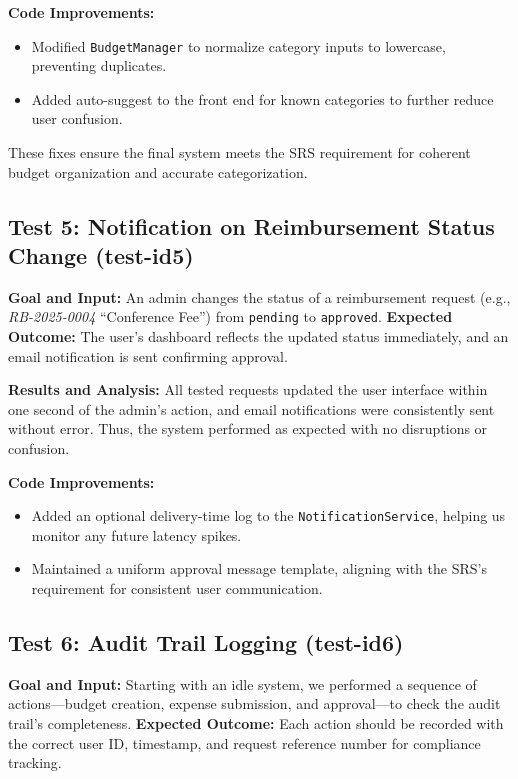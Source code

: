 \documentclass[12pt, titlepage]{article}
\begin{document}
\noindent
\textbf{Code Improvements:}
\begin{itemize}
  \item Modified \texttt{BudgetManager} to normalize category inputs to lowercase, preventing duplicates.
  \item Added auto-suggest to the front end for known categories to further reduce user confusion.
\end{itemize}
These fixes ensure the final system meets the SRS requirement for coherent budget organization and accurate categorization.


\subsection{Test 5: Notification on Reimbursement Status Change (test-id5)}

\noindent
\textbf{Goal and Input:}  
An admin changes the status of a reimbursement request (e.g., \emph{RB-2025-0004} “Conference Fee”) from \texttt{pending} to \texttt{approved}.  
\textbf{Expected Outcome:} The user’s dashboard reflects the updated status immediately, and an email notification is sent confirming approval.

\noindent
\textbf{Results and Analysis:}  
All tested requests updated the user interface within one second of the admin’s action, and email notifications were consistently sent without error. Thus, the system performed as expected with no disruptions or confusion.

\noindent
\textbf{Code Improvements:}
\begin{itemize}
  \item Added an optional delivery-time log to the \texttt{NotificationService}, helping us monitor any future latency spikes.
  \item Maintained a uniform approval message template, aligning with the SRS’s requirement for consistent user communication.
\end{itemize}


\subsection{Test 6: Audit Trail Logging (test-id6)}

\noindent
\textbf{Goal and Input:}  
Starting with an idle system, we performed a sequence of actions—budget creation, expense submission, and approval—to check the audit trail’s completeness.  
\textbf{Expected Outcome:} Each action should be recorded with the correct user ID, timestamp, and request reference number for compliance tracking.
\end{document}

